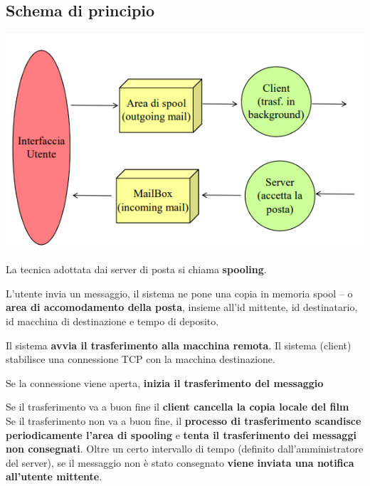 \documentclass[10pt]{article}
\begin{document}
\subsection{Schema di principio}
\begin{center}
\includegraphics[scale=0.7]{smtpschemascambio.png}
\end{center}
La tecnica adottata dai server di posta si chiama \textbf{spooling}.
\begin{list}{}{}
\item L'utente invia un messaggio, il sistema ne pone una copia in memoria spool -- o \textbf{area di accomodamento della posta}, insieme all'id mittente, id destinatario, id macchina di destinazione e tempo di deposito.
\item Il sistema \textbf{avvia il trasferimento alla macchina remota}. Il sistema (client) stabilisce una connessione TCP con la macchina destinazione.
\item Se la connessione viene aperta, \textbf{inizia il trasferimento del messaggio}
\item Se il trasferimento va a buon fine il \textbf{client cancella la copia locale del film}\\
Se il trasferimento non va a buon fine, il \textbf{processo di trasferimento scandisce periodicamente l'area di spooling} e \textbf{tenta il trasferimento dei messaggi non consegnati}. Oltre un certo intervallo di tempo (definito dall'amministratore del server), se il messaggio non è stato consegnato \textbf{viene inviata una notifica all'utente mittente}.
\end{list}
\end{document}
